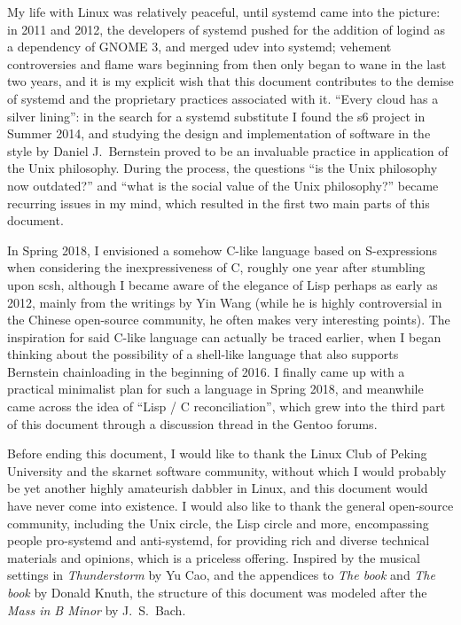 \documentclass{article}
\begin{document}
My life with Linux was relatively peaceful, until systemd came into the picture:
in 2011 and 2012, the developers of systemd pushed for the addition of logind
as a dependency of GNOME 3, and merged udev into
systemd; vehement controversies and flame wars beginning
from then only began to wane in the last two years,
and it is my explicit wish that this document contributes to the demise of
systemd and the proprietary practices associated with it.  ``Every cloud has
a silver lining'': in the search for a systemd substitute I found the s6 project
in Summer 2014, and studying the design and implementation of software in the
style by Daniel J.\ Bernstein proved to be an invaluable practice in application
of the Unix philosophy.  During the process, the questions ``is the Unix
philosophy now outdated?'' and ``what is the social value of the Unix
philosophy?'' became recurring issues in my mind, which resulted
in the first two main parts of this document.

In Spring 2018, I envisioned a somehow C-like language based on S-expressions
when considering the inexpressiveness of C, roughly
one year after stumbling upon scsh, although I
became aware of the elegance of Lisp perhaps as early as 2012, mainly from
the writings by Yin Wang (while he is highly controversial in the Chinese
open-source community, he often makes very interesting points).  The
inspiration for said C-like language can actually be traced earlier, when
I began thinking about the possibility of a shell-like language that also
supports Bernstein chainloading in the beginning of
2016.  I finally came up with a practical minimalist plan for such a language%
 in Spring 2018, and meanwhile came across the idea of
``Lisp / C reconciliation'', which grew into the third part of this document
through a discussion thread in the Gentoo forums.

Before ending this document, I would like to thank the Linux Club of Peking
University and the skarnet software community, without which I would probably
be yet another highly amateurish dabbler in Linux, and this document would
have never come into existence.  I would also like to thank the general
open-source community, including the Unix circle, the Lisp circle and more,
encompassing people pro-systemd and anti-systemd, for providing rich and
diverse technical materials and opinions, which is a priceless offering.
Inspired by the musical settings in \emph{Thunderstorm} by Yu Cao,
and the appendices to \emph{The book} and \emph{The
book} by Donald Knuth, the structure of this
document was modeled after the \emph{Mass in B Minor} by J.\ S.\ Bach.
\end{document}
